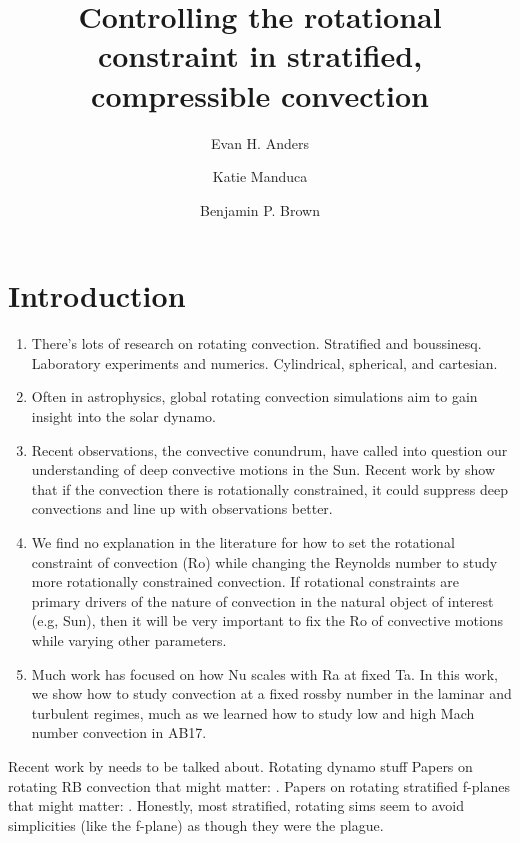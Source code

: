 \documentclass[twocolumn, amsmath, amsfonts, amssymb]{aastex62}
\begin{document}
\title{Controlling the rotational constraint in stratified, compressible convection}


\author{Evan H. Anders}
\author{Katie Manduca}
\author{Benjamin P. Brown}


\begin{abstract}
\end{abstract}


\section{Introduction}
\label{sec:intro}
\begin{enumerate}
\item There's lots of research on rotating convection. Stratified and boussinesq.
Laboratory experiments and numerics. Cylindrical, spherical, and cartesian.
\item Often in astrophysics, global rotating convection simulations aim to gain
insight into the solar dynamo.
\item Recent observations, the convective conundrum, have called into question
our understanding of deep convective motions in the Sun. Recent work
by \cite{featherstone&hindman2016} show that if the convection there is
rotationally constrained, it could suppress deep convections and line up with
observations better.
\item We find no explanation in the literature for how to set the rotational
constraint of convection (Ro) while changing the Reynolds number to study more
rotationally constrained convection. If rotational constraints are primary 
drivers of the nature of convection in the natural object of interest (e.g, Sun),
then it will be very important to fix the Ro of convective motions while
varying other parameters.
\item Much work has focused on how Nu scales with Ra at fixed Ta. In this work,
we show how to study convection at a fixed rossby number in the laminar and 
turbulent regimes, much as we learned how to study low and high Mach number
convection in AB17.
\end{enumerate}
Recent work by \cite{featherstone&hindman2016} needs to be talked about.
Rotating dynamo stuff \cite{busse2002, brown&all2008, brown&all2010, brown&all2011} 
Papers on rotating RB convection that might matter:
\cite{hathaway&somerville1983, julien&all1996, zhong&all2009, julien&all2012, stellmach&all2014}.
Papers on rotating stratified f-planes that might matter:
\cite{brummell&all1996, brummell&all1998, calkins&all2015a}.  Honestly, most stratified, rotating sims
seem to avoid simplicities (like the f-plane) as though they were the plague.
\end{document}
